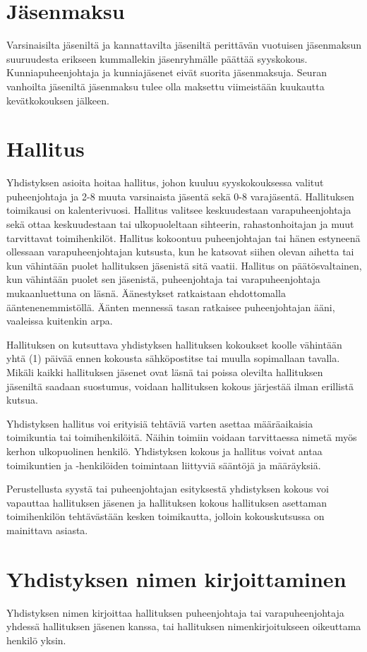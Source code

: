 \documentclass[a4paper, 12pt, finnish]{scrartcl}
\begin{document}
\section{Jäsenmaksu}
Varsinaisilta jäseniltä ja kannattavilta jäseniltä perittävän vuotuisen jäsenmaksun suuruudesta erikseen kummallekin jäsenryhmälle päättää syyskokous.
Kunniapuheenjohtaja ja kunniajäsenet eivät suorita jäsenmaksuja.
Seuran vanhoilta jäseniltä jäsenmaksu tulee olla maksettu viimeistään kuukautta kevätkokouksen jälkeen.


\section{Hallitus}
Yhdistyksen asioita hoitaa hallitus, johon kuuluu syyskokouksessa valitut puheenjohtaja ja 2-8 muuta varsinaista jäsentä sekä 0-8 varajäsentä.
Hallituksen toimikausi on kalenterivuosi.
Hallitus valitsee keskuudestaan varapuheenjohtaja sekä ottaa keskuudestaan tai ulkopuoleltaan sihteerin, rahastonhoitajan ja muut tarvittavat toimihenkilöt.
Hallitus kokoontuu puheenjohtajan tai hänen estyneenä ollessaan varapuheenjohtajan kutsusta, kun he katsovat siihen olevan aihetta tai kun vähintään puolet hallituksen jäsenistä sitä vaatii.
Hallitus on päätösvaltainen, kun vähintään puolet sen jäsenistä, puheenjohtaja tai varapuheenjohtaja mukaanluettuna on läsnä.
Äänestykset ratkaistaan ehdottomalla ääntenenemmistöllä.
Äänten mennessä tasan ratkaisee puheenjohtajan ääni, vaaleissa kuitenkin arpa.

Hallituksen on kutsuttava yhdistyksen hallituksen kokoukset koolle vähintään yhtä (1) päivää ennen kokousta sähköpostitse tai muulla sopimallaan tavalla.
Mikäli kaikki hallituksen jäsenet ovat läsnä tai poissa olevilta hallituksen jäseniltä saadaan suostumus, voidaan hallituksen kokous järjestää ilman erillistä kutsua.

Yhdistyksen hallitus voi erityisiä tehtäviä varten asettaa määräaikaisia toimikuntia tai toimihenkilöitä.
Näihin toimiin voidaan tarvittaessa nimetä myös kerhon ulkopuolinen henkilö.
Yhdistyksen kokous ja hallitus voivat antaa toimikuntien ja -henkilöiden toimintaan liittyviä sääntöjä ja määräyksiä.

Perustellusta syystä tai puheenjohtajan esityksestä yhdistyksen kokous voi vapauttaa hallituksen jäsenen ja hallituksen kokous hallituksen asettaman toimihenkilön tehtävästään kesken toimikautta, jolloin kokouskutsussa on mainittava asiasta.

\section{Yhdistyksen nimen kirjoittaminen}
Yhdistyksen nimen kirjoittaa hallituksen puheenjohtaja tai varapuheenjohtaja yhdessä hallituksen jäsenen kanssa, tai hallituksen nimenkirjoitukseen oikeuttama henkilö yksin.
\end{document}
